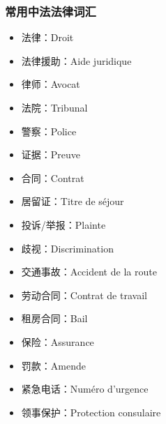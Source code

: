 \subsubsection{常用中法法律词汇}
\begin{itemize}
    \item 法律：Droit
    \item 法律援助：Aide juridique
    \item 律师：Avocat
    \item 法院：Tribunal
    \item 警察：Police
    \item 证据：Preuve
    \item 合同：Contrat
    \item 居留证：Titre de séjour
    \item 投诉/举报：Plainte
    \item 歧视：Discrimination
    \item 交通事故：Accident de la route
    \item 劳动合同：Contrat de travail
    \item 租房合同：Bail
    \item 保险：Assurance
    \item 罚款：Amende
    \item 紧急电话：Numéro d’urgence
    \item 领事保护：Protection consulaire
\end{itemize}
